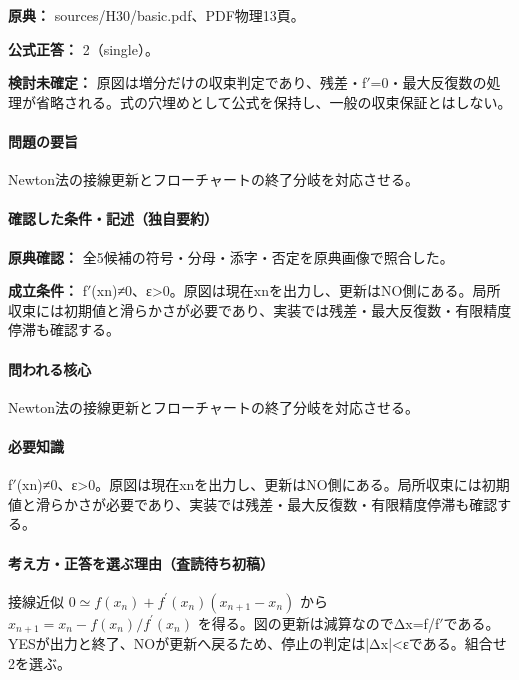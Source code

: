 \noindent\textbf{原典：} sources/H30/basic.pdf、PDF物理13頁。

\textbf{公式正答：} 2（single）。

\par\textbf{検討未確定：} 原図は増分だけの収束判定であり、残差・f\ensuremath{'}=0・最大反復数の処理が省略される。式の穴埋めとして公式を保持し、一般の収束保証とはしない。

\paragraph{問題の要旨} Newton法の接線更新とフローチャートの終了分岐を対応させる。

\paragraph{確認した条件・記述（独自要約）}\mbox{}\par

\noindent\textbf{原典確認：} 全5候補の符号・分母・添字・否定を原典画像で照合した。\par

\noindent\textbf{成立条件：} f\ensuremath{'}(xn)≠0、ε>0。原図は現在xnを出力し、更新はNO側にある。局所収束には初期値と滑らかさが必要であり、実装では残差・最大反復数・有限精度停滞も確認する。\par

\paragraph{問われる核心} Newton法の接線更新とフローチャートの終了分岐を対応させる。

\paragraph{必要知識} f\ensuremath{'}(xn)≠0、ε>0。原図は現在xnを出力し、更新はNO側にある。局所収束には初期値と滑らかさが必要であり、実装では残差・最大反復数・有限精度停滞も確認する。

\paragraph{考え方・正答を選ぶ理由（査読待ち初稿）} 接線近似 \(0\simeq f(x_n)+f^\prime(x_n)(x_{n+1}-x_n)\) から \(x_{n+1}=x_n-f(x_n)/f^\prime(x_n)\) を得る。図の更新は減算なのでΔx=\allowbreak{}f/f\ensuremath{'}である。YESが出力と終了、NOが更新へ戻るため、停止の判定は|Δx|<εである。組合せ2を選ぶ。

